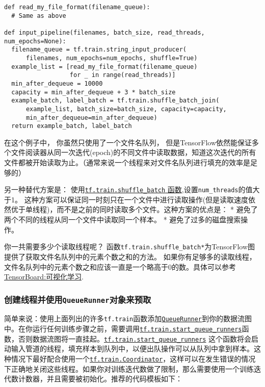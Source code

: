 \begin{verbatim}
def read_my_file_format(filename_queue):
  # Same as above

def input_pipeline(filenames, batch_size, read_threads, num_epochs=None):
  filename_queue = tf.train.string_input_producer(
      filenames, num_epochs=num_epochs, shuffle=True)
  example_list = [read_my_file_format(filename_queue)
                  for _ in range(read_threads)]
  min_after_dequeue = 10000
  capacity = min_after_dequeue + 3 * batch_size
  example_batch, label_batch = tf.train.shuffle_batch_join(
      example_list, batch_size=batch_size, capacity=capacity,
      min_after_dequeue=min_after_dequeue)
  return example_batch, label_batch
\end{verbatim}

在这个例子中， 你虽然只使用了一个文件名队列，
但是TensorFlow依然能保证多个文件阅读器从同一次迭代(epoch)的不同文件中读取数据，知道这次迭代的所有文件都被开始读取为止。（通常来说一个线程来对文件名队列进行填充的效率是足够的）

另一种替代方案是：
使用\href{tensorflow-zh/SOURCE/api_docs/python/io_ops.md\#shuffle_batch}{\texttt{tf.train.shuffle\_batch}
函数},设置\texttt{num\_threads}的值大于1。
这种方案可以保证同一时刻只在一个文件中进行读取操作(但是读取速度依然优于单线程)，而不是之前的同时读取多个文件。这种方案的优点是：
* 避免了两个不同的线程从同一个文件中读取同一个样本。 *
避免了过多的磁盘搜索操作。

你一共需要多少个读取线程呢？
函数\texttt{tf.train.shuffle\_batch*}为TensorFlow图提供了获取文件名队列中的元素个数之和的方法。
如果你有足够多的读取线程，
文件名队列中的元素个数之和应该一直是一个略高于0的数。具体可以参考\href{tensorflow-zh/SOURCE/how_tos/summaries_and_tensorboard/index.md}{TensorBoard:可视化学习}.

\subsubsection{\texorpdfstring{创建线程并使用\texttt{QueueRunner}对象来预取
}{创建线程并使用QueueRunner对象来预取 }}\label{ux521bux5efaux7ebfux7a0bux5e76ux4f7fux7528queuerunnerux5bf9ux8c61ux6765ux9884ux53d6}

简单来说：使用上面列出的许多\texttt{tf.train}函数添加\href{../../api_docs/python/train.md\#QueueRunner}{\texttt{QueueRunner}}到你的数据流图中。在你运行任何训练步骤之前，需要调用\href{../../api_docs/python/train.md\#start_queue_runners}{\texttt{tf.train.start\_queue\_runners}}函数，否则数据流图将一直挂起。\href{../../api_docs/python/train.md\#start_queue_runners}{\texttt{tf.train.start\_queue\_runners}}
这个函数将会启动输入管道的线程，填充样本到队列中，以便出队操作可以从队列中拿到样本。这种情况下最好配合使用一个\href{../../api_docs/python/train.md\#Coordinator}{\texttt{tf.train.Coordinator}}，这样可以在发生错误的情况下正确地关闭这些线程。如果你对训练迭代数做了限制，那么需要使用一个训练迭代数计数器，并且需要被初始化。推荐的代码模板如下：

